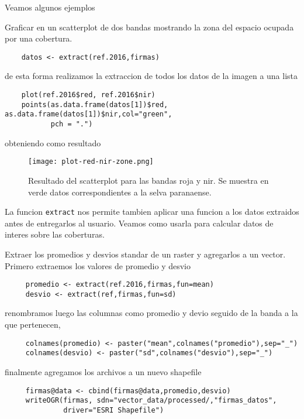 Veamos algunos ejemplos

\begin{exa}
    Graficar en un scatterplot de dos bandas mostrando la zona del espacio 
    ocupada por una cobertura.
    \begin{lstlisting}
    datos <- extract(ref.2016,firmas)
    \end{lstlisting}
    de esta forma realizamos la extraccion de todos los datos de la imagen a una
    lista
    \begin{lstlisting}
    plot(ref.2016$red, ref.2016$nir)
    points(as.data.frame(datos[1])$red, as.data.frame(datos[1])$nir,col="green",
           pch = ".")
    \end{lstlisting}
    obteniendo como resultado
    \begin{figure}
    \begin{center}
        \texttt{[image: plot-red-nir-zone.png]}
    \end{center}
    \caption{Resultado del scatterplot para las bandas roja y nir. Se muestra en
        verde datos correspondientes a la selva paranaense.}
    \label{fig:}
    \end{figure}
    
\end{exa}

La funcion \texttt{extract} nos permite tambien aplicar una funcion a los datos
extraidos antes de entregarlos al usuario. Veamos como usarla para calcular
datos de interes sobre las coberturas.

\begin{exa}
     Extraer los promedios y desvios standar de un raster y agregarlos a un
     vector. Primero extraemos los valores de promedio y desvio
     \begin{lstlisting}
     promedio <- extract(ref.2016,firmas,fun=mean)
     desvio <- extract(ref,firmas,fun=sd)
     \end{lstlisting}
     renombramos luego las columnas como promedio y devio seguido de la banda a
     la que pertenecen,
     \begin{lstlisting}
     colnames(promedio) <- paster("mean",colnames("promedio"),sep="_")
     colnames(desvio) <- paster("sd",colnames("desvio"),sep="_")
     \end{lstlisting}
     finalmente agregamos los archivos a un nuevo shapefile
     \begin{lstlisting}
     firmas@data <- cbind(firmas@data,promedio,desvio)
     writeOGR(firmas, sdn="vector_data/processed/,"firmas_datos",
              driver="ESRI Shapefile")
     \end{lstlisting}
\end{exa}

